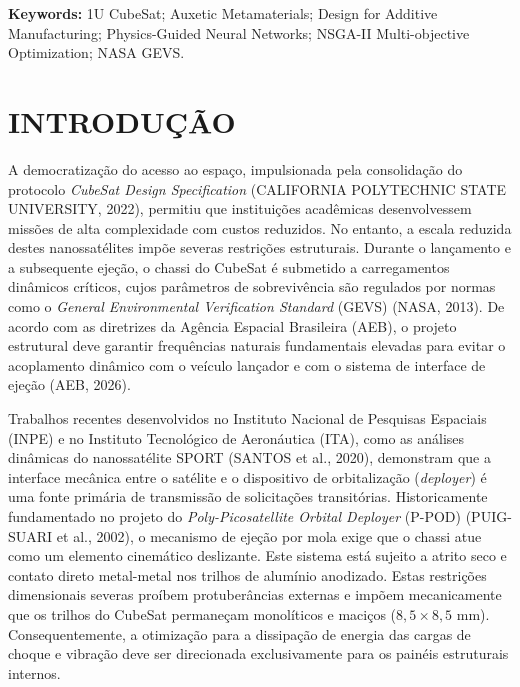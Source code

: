 \documentclass[12pt,a4paper]{report}
\begin{document}
\vspace{0.5cm}
\noindent \textbf{Keywords:} 1U CubeSat; Auxetic Metamaterials; Design for Additive Manufacturing; Physics-Guided Neural Networks; NSGA-II Multi-objective Optimization; NASA GEVS.

\clearpage
\tableofcontents

\clearpage
\listoffigures

\clearpage
\listoftables

\clearpage
\chapter{INTRODUÇÃO}

A democratização do acesso ao espaço, impulsionada pela consolidação do protocolo \textit{CubeSat Design Specification} (CALIFORNIA POLYTECHNIC STATE UNIVERSITY, 2022), permitiu que instituições acadêmicas desenvolvessem missões de alta complexidade com custos reduzidos. No entanto, a escala reduzida destes nanossatélites impõe severas restrições estruturais. Durante o lançamento e a subsequente ejeção, o chassi do CubeSat é submetido a carregamentos dinâmicos críticos, cujos parâmetros de sobrevivência são regulados por normas como o \textit{General Environmental Verification Standard} (GEVS) (NASA, 2013). De acordo com as diretrizes da Agência Espacial Brasileira (AEB), o projeto estrutural deve garantir frequências naturais fundamentais elevadas para evitar o acoplamento dinâmico com o veículo lançador e com o sistema de interface de ejeção (AEB, 2026).

Trabalhos recentes desenvolvidos no Instituto Nacional de Pesquisas Espaciais (INPE) e no Instituto Tecnológico de Aeronáutica (ITA), como as análises dinâmicas do nanossatélite SPORT (SANTOS et al., 2020), demonstram que a interface mecânica entre o satélite e o dispositivo de orbitalização (\textit{deployer}) é uma fonte primária de transmissão de solicitações transitórias. Historicamente fundamentado no projeto do \textit{Poly-Picosatellite Orbital Deployer} (P-POD) (PUIG-SUARI et al., 2002), o mecanismo de ejeção por mola exige que o chassi atue como um elemento cinemático deslizante. Este sistema está sujeito a atrito seco e contato direto metal-metal nos trilhos de alumínio anodizado. Estas restrições dimensionais severas proíbem protuberâncias externas e impõem mecanicamente que os trilhos do CubeSat permaneçam monolíticos e maciços ($8{,}5 \times 8{,}5\text{ mm}$). Consequentemente, a otimização para a dissipação de energia das cargas de choque e vibração deve ser direcionada exclusivamente para os painéis estruturais internos.
\end{document}
